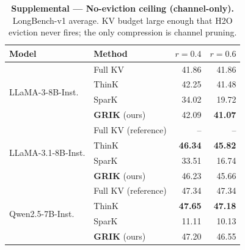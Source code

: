 \begin{table}[t]
\centering
\small
\setlength{\tabcolsep}{6pt}
\renewcommand{\arraystretch}{1.05}
\caption{\textbf{Supplemental — No-eviction ceiling (channel-only).}
LongBench-v1 average. KV budget large enough that H2O eviction never fires;
the only compression is channel pruning.}
\label{tab:longbench-noevict}
\begin{tabular}{llrr}
\toprule
Model & Method & $r{=}0.4$ & $r{=}0.6$ \\
\midrule
\multirow{4}{*}{LLaMA-3-8B-Inst.}
 & Full KV~\citep{think}                  & 41.86          & 41.86          \\
 & ThinK                                  & 42.25          & 41.48          \\
 & SparK                                  & 34.02          & 19.72          \\
 & \textbf{GRIK} (ours)                   & 42.09          & \textbf{41.07} \\
\midrule
\multirow{4}{*}{LLaMA-3.1-8B-Inst.}
 & Full KV (reference)                    & --             & --             \\
 & ThinK                                  & \textbf{46.34} & \textbf{45.82} \\
 & SparK                                  & 33.51          & 16.74          \\
 & \textbf{GRIK} (ours)                   & 46.23          & 45.66          \\
\midrule
\multirow{4}{*}{Qwen2.5-7B-Inst.}
 & Full KV (reference)                    & 47.34          & 47.34          \\
 & ThinK                                  & \textbf{47.65} & \textbf{47.18} \\
 & SparK                                  & 11.11          & 10.13          \\
 & \textbf{GRIK} (ours)                   & 47.20          & 46.55          \\
\bottomrule
\end{tabular}
\end{table}
